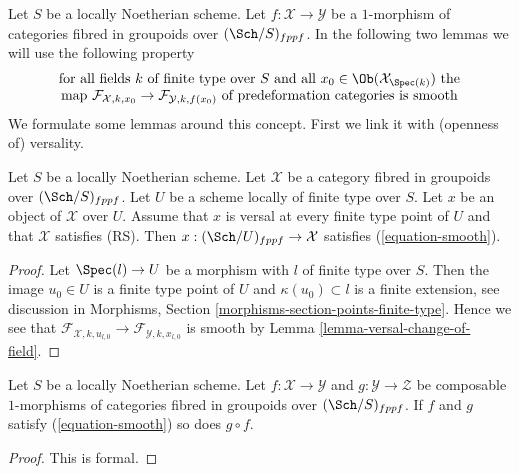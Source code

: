 \noindent
Let $S$ be a locally Noetherian scheme.
Let $f : \mathcal{X} \to \mathcal{Y}$ be a $1$-morphism of categories
fibred in groupoids over $(\Sch/S)_{fppf}$. In the following two lemmas
we will use the following property
\begin{equation}
\label{equation-smooth}
\begin{matrix}
\text{for all fields }k\text{ of finite type over }S
\text{ and all }x_0 \in \Ob(\mathcal{X}_{\Spec(k)})\text{ the}\\
\text{map }
\mathcal{F}_{\mathcal{X}, k, x_0} \to \mathcal{F}_{\mathcal{Y}, k, f(x_0)}
\text{ of predeformation categories is smooth}
\end{matrix}
\end{equation}
We formulate some lemmas around this concept. First we link it with
(openness of) versality.

\begin{lemma}
\label{lemma-versal-smooth}
Let $S$ be a locally Noetherian scheme. Let $\mathcal{X}$ be a category
fibred in groupoids over $(\Sch/S)_{fppf}$. Let $U$ be a scheme locally
of finite type over $S$. Let $x$ be an object of $\mathcal{X}$ over $U$.
Assume that $x$ is versal at every finite type point of $U$ and that
$\mathcal{X}$ satisfies (RS). Then $x : (\Sch/U)_{fppf} \to \mathcal{X}$
satisfies (\ref{equation-smooth}).
\end{lemma}

\begin{proof}
Let $\Spec(l) \to U$ be a morphism with $l$ of finite type over $S$.
Then the image $u_0 \in U$ is a finite type point of $U$ and
$\kappa(u_0) \subset l$ is a finite extension, see discussion in
Morphisms, Section \ref{morphisms-section-points-finite-type}.
Hence we see that
$\mathcal{F}_{\mathcal{X}, k, u_{l, 0}} \to
\mathcal{F}_{\mathcal{Y}, k, x_{l, 0}}$
is smooth by Lemma \ref{lemma-versal-change-of-field}.
\end{proof}

\begin{lemma}
\label{lemma-composition-smooth}
Let $S$ be a locally Noetherian scheme. Let $f : \mathcal{X} \to \mathcal{Y}$
and $g : \mathcal{Y} \to \mathcal{Z}$ be composable $1$-morphisms of
categories fibred in groupoids over $(\Sch/S)_{fppf}$. If $f$ and $g$
satisfy (\ref{equation-smooth}) so does $g \circ f$.
\end{lemma}

\begin{proof}
This is formal.
\end{proof}

